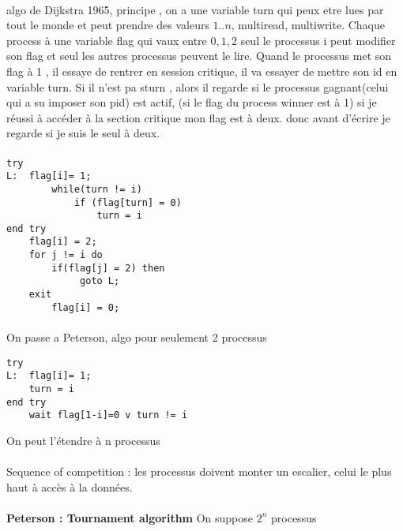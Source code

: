 \documentclass{article}
\begin{document}
\paragraph{} algo de Dijkstra 1965, principe , on a une variable turn qui peux etre lues par tout le monde et peut prendre des valeurs $ 1..n$, multiread, multiwrite. Chaque process à une variable flag qui vaux entre $0,1,2$ seul le processus i peut modifier son flag et seul les autres processus peuvent le lire. Quand le processus met son flag à 1 , il essaye de rentrer en session critique, il va essayer de mettre son id en variable turn. Si il n'est pa sturn , alors il regarde si le processus gagnant(celui qui a su imposer son pid) est actif, (si le flag du process winner est à  1) si je réussi à accéder à la section critique mon flag est  à deux. donc avant d'écrire je regarde si je suis le seul à deux. 
\paragraph{}
\begin{verbatim}
try 
L:	flag[i]= 1;
		while(turn != i)
			if (flag[turn] = 0)
				turn = i
end try
	flag[i] = 2;
	for j != i do
		if(flag[j] = 2) then
			 goto L;
	exit
		flag[i] = 0;
\end{verbatim}
\paragraph{ } On passe a Peterson, algo pour seulement 2 processus
\begin{verbatim}
try 
L:	flag[i]= 1;
	turn = i
end try
	wait flag[1-i]=0 v turn != i 
\end{verbatim}
On peut l'étendre à n processus
\paragraph{} Sequence of competition : les processus doivent monter un escalier, celui le plus haut à accès à la données.\\\\\textbf{Peterson : Tournament algorithm } On suppose $2^n$ processus
\end{document}
